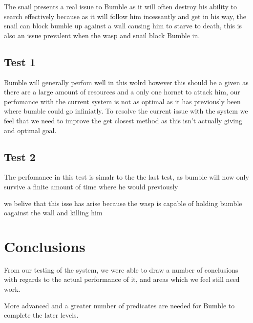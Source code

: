 \documentclass[a4paper,oneside]{report}
\begin{document}
	The snail presents a real issue to Bumble as it will often destroy his ability to search effectively because as it will follow him incessantly and get in his way, the snail can block bumble up against a wall causing him to starve to death, this is also an issue prevalent when the wasp and snail block Bumble in.

	
	\subsection{Test 1}
		Bumble will generally perfom well in this wolrd however this should be a given as there are a large amount of resources and a only one hornet to attack him, our perfomance with the current system is not as optimal as it has previously been where bumble could go infiniatly. To resolve the current issue with the system we feel that we need to improve the get closest method as this isn't actually giving and optimal goal. 
		
	\subsection{Test 2}
		The perfomance in this test is simalr to the the last test,  as bumble will now only survive a finite amount of time where he would previously 
		
		
		we belive that this isse has arise because the wasp is capable of holding bumble oagainst the wall and killing him
	
	
	

\section{Conclusions}

From our testing of the system, we were able to draw a number of conclusions with regards to the actual performance of it, and areas which we feel still need work.

More advanced and a greater number of predicates are needed for Bumble to complete the later levels.
\end{document}
